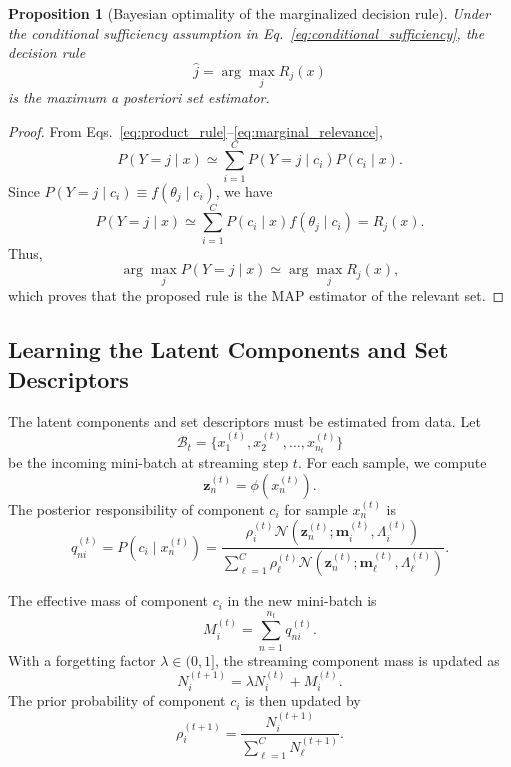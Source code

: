 \documentclass{article}
\theoremstyle{plain}
\newtheorem{proposition}{Proposition}
\theoremstyle{definition}
\theoremstyle{remark}
\begin{document}
\begin{proposition}[Bayesian optimality of the marginalized decision rule]
	\label{prop:bayesian_optimality}
	Under the conditional sufficiency assumption in Eq.~\eqref{eq:conditional_sufficiency}, the decision rule
	\[
	\widehat j
	=
	\arg\max_j R_j(x)
	\]
	is the maximum a posteriori set estimator.
\end{proposition}

\begin{proof}
	From Eqs.~\eqref{eq:product_rule}--\eqref{eq:marginal_relevance},
	\[
	P(Y=j\mid x)
	\simeq
	\sum_{i=1}^{C}
	P(Y=j\mid c_i)P(c_i\mid x).
	\]
	Since \(P(Y=j\mid c_i)\equiv f(\theta_j\mid c_i)\), we have
	\[
	P(Y=j\mid x)
	\simeq
	\sum_{i=1}^{C}
	P(c_i\mid x)f(\theta_j\mid c_i)
	=
	R_j(x).
	\]
	Thus,
	\[
	\arg\max_j P(Y=j\mid x)
	\simeq
	\arg\max_j R_j(x),
	\]
	which proves that the proposed rule is the MAP estimator of the relevant set.
\end{proof}

\subsection{Learning the Latent Components and Set Descriptors}
\label{subsec:learning_parameters}

The latent components and set descriptors must be estimated from data. Let
\[
\mathcal B_t=\{x_1^{(t)},x_2^{(t)},\ldots,x_{n_t}^{(t)}\}
\]
be the incoming mini-batch at streaming step \(t\). For each sample, we compute
\[
\mathbf z_n^{(t)}=\phi(x_n^{(t)}).
\]
The posterior responsibility of component \(c_i\) for sample \(x_n^{(t)}\) is
\begin{equation}
	\label{eq:responsibility_stream}
	q_{ni}^{(t)}
	=
	P(c_i\mid x_n^{(t)})
	=
	\frac{
		\rho_i^{(t)}
		\mathcal N(\mathbf z_n^{(t)};\mathbf m_i^{(t)},\Lambda_i^{(t)})
	}{
		\sum_{\ell=1}^{C}
		\rho_\ell^{(t)}
		\mathcal N(\mathbf z_n^{(t)};\mathbf m_\ell^{(t)},\Lambda_\ell^{(t)})
	}.
\end{equation}

The effective mass of component \(c_i\) in the new mini-batch is
\begin{equation}
	\label{eq:effective_mass}
	M_i^{(t)}
	=
	\sum_{n=1}^{n_t}
	q_{ni}^{(t)}.
\end{equation}
With a forgetting factor \(\lambda\in(0,1]\), the streaming component mass is updated as
\begin{equation}
	\label{eq:streaming_mass}
	N_i^{(t+1)}
	=
	\lambda N_i^{(t)}
	+
	M_i^{(t)}.
\end{equation}
The prior probability of component \(c_i\) is then updated by
\begin{equation}
	\label{eq:rho_update}
	\rho_i^{(t+1)}
	=
	\frac{N_i^{(t+1)}}{\sum_{\ell=1}^{C}N_\ell^{(t+1)}}.
\end{equation}
\end{document}
